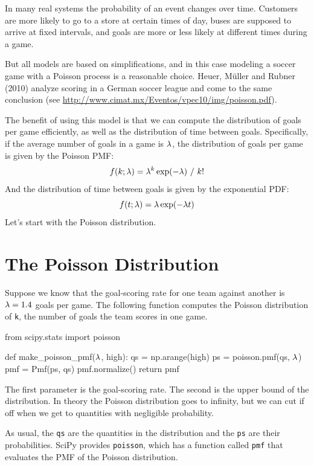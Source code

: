 \documentclass[12pt]{book}
\theoremstyle{exercise}
\newcommand{\py}[1]{{\tt #1}}%
\begin{document}
In many real systems the probability of an event changes over time.
Customers are more likely to go to a store at certain times of day,
buses are supposed to arrive at fixed intervals, and goals are more
or less likely at different times during a game.

But all models are based on simplifications, and in this case modeling
a soccer game with a Poisson process is a reasonable choice.  Heuer,
M\"{u}ller and Rubner (2010) analyze scoring in a German soccer league
and come to the same conclusion (see
\url{http://www.cimat.mx/Eventos/vpec10/img/poisson.pdf}).

The benefit of using this model is that we can compute the distribution
of goals per game efficiently, as well as the distribution of time
between goals.  Specifically, if the average number of goals
in a game is $\mathtt{\lambda}$, the distribution of goals per game is
given by the Poisson PMF:
%
\[ f(k; \mathtt{\lambda}) = \mathtt{\lambda}^k \exp(-\mathtt{\lambda}) ~/~ k! \]
%
And the distribution of time between goals is given by the
exponential PDF:
%
\[ f(t; \mathtt{\lambda}) = \mathtt{\lambda} \exp(-\mathtt{\lambda} t) \]
%
Let's start with the Poisson distribution.


\section{The Poisson Distribution}

Suppose we know that the goal-scoring rate for one team against another is $\mathtt{\lambda} = 1.4$ goals per game.
The following function computes the Poisson distribution of \py{k}, the number of goals the team scores in one game.

\begin{code}
from scipy.stats import poisson

def make_poisson_pmf($\mathtt{\lambda}$, high):
    qs = np.arange(high)
    ps = poisson.pmf(qs, $\mathtt{\lambda}$)
    pmf = Pmf(ps, qs)
    pmf.normalize()
    return pmf
\end{code}

The first parameter is the goal-scoring rate.
The second is the upper bound of the distribution.
In theory the Poisson distribution goes to infinity, but we can cut if off when we get to quantities with negligible probability.

As usual, the \py{qs} are the quantities in the distribution and the \py{ps} are their probabilities.
SciPy provides \py{poisson}, which has a function called \py{pmf} that evaluates the PMF of the Poisson distribution.
\end{document}
